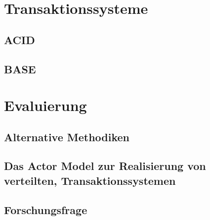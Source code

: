 

\chapter{Transaktionssysteme}
\section{ACID}\label{sec:transactionTheory:acid}
\section{BASE}\label{sec:transactionTheory:base}
\chapter{Evaluierung}
\section{Alternative Methodiken}
\section{Das Actor Model zur Realisierung von verteilten, Transaktionssystemen} 
\section{Forschungsfrage} 

